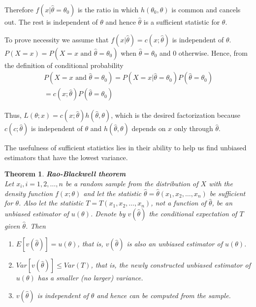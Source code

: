 \documentclass{article}
\newtheorem{theorem}{Theorem}[section]
\begin{document}
Therefore \(f(x|\hat{\theta}=\theta_0)\) is the ratio in which \(h(\theta_0,\theta)\) is common and cancels out. The rest is independent of \(\theta\) and hence \(\hat{\theta}\) is a sufficient statistic for \(\theta\).

To prove necessity we assume that \(f(x|\hat{\theta})=c(x;\hat{\theta})\) is independent of \(\theta\). \(P(X=x)=P(X=x \text{ and } \hat{\theta}=\theta_0)\) when \(\hat{\theta}=\theta_0\) and \(0\) otherwise. Hence, from the definition of conditional probability
\begin{equation*}
\begin{split}
    P(X=x \text{ and } \hat{\theta}=\theta_0) = P(X=x|\hat{\theta}=\theta_0) P(\hat{\theta}=\theta_0)\\
    = c(x;\hat{\theta}) P(\hat{\theta}=\theta_0)
\end{split}
\end{equation*}

Thus, \(L(\theta;x)=c(x;\hat{\theta})h(\hat{\theta},\theta)\), which is the desired factorization because \(c(c;\hat{\theta})\) is independent of \(\theta\) and \(h(\hat{\theta},\theta)\) depends on \(x\) only through \(\hat{\theta}\).

The usefulness of sufficient statistics lies in their ability to help us find unbiased estimators that have the lowest variance.

\begin{theorem}
    \textbf{Rao-Blackwell theorem}\\
    
    Let \(x_i, i=1,2,\dots,n\) be a random sample from the distribution of \(X\) with the density function \(f(x;\theta)\) and let the statistic \(\hat{\theta}=\hat{\theta}(x_1,x_2,\dots,x_n)\) be sufficient for \(\theta\). Also let the statistic \(T=T(x_1,x_2,\dots,x_n)\), not a function of \(\hat{\theta}\), be an unbiased estimator of \(u(\theta)\). Denote by \(v(\hat{\theta})\) the conditional expectation of \(T\) given \(\hat{\theta}\). Then
    \begin{enumerate}
        \item \(E[v(\hat{\theta})]=u(\theta)\), that is, \(v(\hat{\theta})\) is also an unbiased estimator of \(u(\theta)\).
        \item \(Var[v(\hat{\theta})] \leq Var(T)\), that is, the newly constructed unbiased estimator of \(u(\theta)\) has a smaller (no larger) variance.
        \item \(v(\hat{\theta})\) is independent of \(\theta\) and hence can be computed from the sample.
    \end{enumerate}
\end{theorem}
\end{document}
